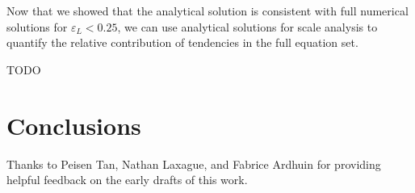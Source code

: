 \documentclass[draft]{agujournal2019}
\begin{document}
Now that we showed that the analytical solution is consistent with full numerical
solutions for $\varepsilon_L < 0.25$, we can use analytical solutions for scale
analysis to quantify the relative contribution of tendencies in the full equation set.

TODO

\section{Conclusions}

\acknowledgments
Thanks to Peisen Tan, Nathan Laxague, and Fabrice Ardhuin for providing helpful
feedback on the early drafts of this work.


\end{document}
